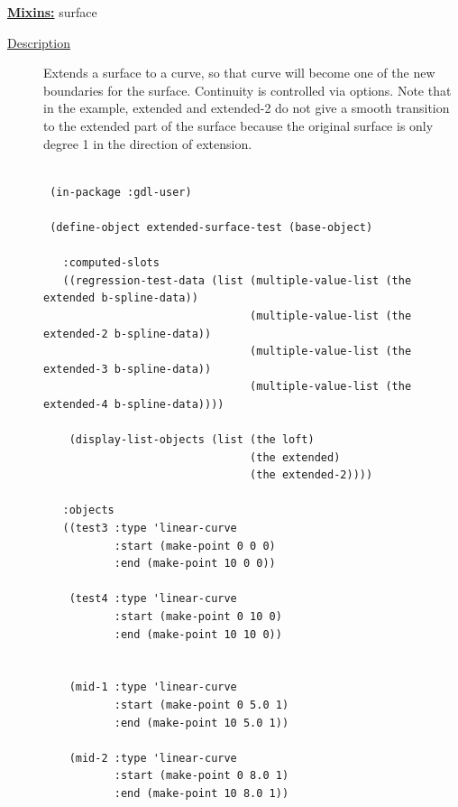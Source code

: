 \documentclass [11pt]{book}
\begin{document}
\begin{itemize}
\textbf{
\underline{Mixins:}} surface





\begin{description}

\item [
\underline{Description}]


Extends a surface to a curve, so that curve will 
become one of the new boundaries for the surface. Continuity is controlled via
options. Note that in the example, extended and extended-2 do not give a smooth
transition to the extended part of the surface because the original surface
is only degree 1 in the direction of extension.



\end{description}




\begin{figure}
\begin{lrbox}{\boxedverb}
\begin{minipage}{\linewidth}
{\small

\begin{verbatim}

 (in-package :gdl-user)
                   
 (define-object extended-surface-test (base-object)
  
   :computed-slots
   ((regression-test-data (list (multiple-value-list (the extended b-spline-data))
                                (multiple-value-list (the extended-2 b-spline-data))
                                (multiple-value-list (the extended-3 b-spline-data))
                                (multiple-value-list (the extended-4 b-spline-data))))
   
    (display-list-objects (list (the loft)
                                (the extended)
                                (the extended-2))))
  
   :objects
   ((test3 :type 'linear-curve 
           :start (make-point 0 0 0) 
           :end (make-point 10 0 0))
   
    (test4 :type 'linear-curve
           :start (make-point 0 10 0) 
           :end (make-point 10 10 0))
   
   
    (mid-1 :type 'linear-curve
           :start (make-point 0 5.0 1)
           :end (make-point 10 5.0 1))
   
    (mid-2 :type 'linear-curve
           :start (make-point 0 8.0 1)
           :end (make-point 10 8.0 1))
   

\end{verbatim}}
\end{minipage}
\end{lrbox}
\end{figure}
\end{itemize}
\end{document}
